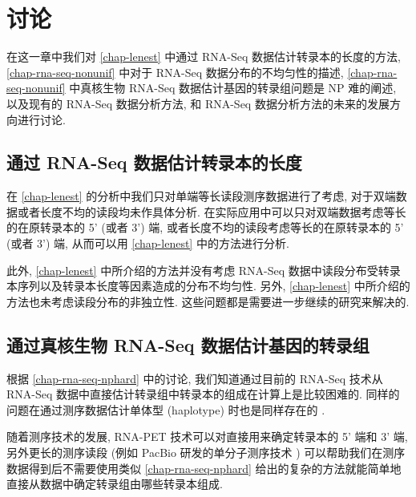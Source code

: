 \chapter{讨论}
在这一章中我们对 \ref{chap-lenest} 中通过 RNA-Seq 数据估计转录本的长度的方法, 
\ref{chap-rna-seq-nonunif} 中对于 RNA-Seq 数据分布的不均匀性的描述, 
\ref{chap-rna-seq-nonunif} 中真核生物 RNA-Seq 数据估计基因的转录组问题是 NP 难的阐述, 
以及现有的 RNA-Seq 数据分析方法, 
和 RNA-Seq 数据分析方法的未来的发展方向进行讨论. 

\section{通过 RNA-Seq 数据估计转录本的长度}
在 \ref{chap-lenest} 的分析中我们只对单端等长读段测序数据进行了考虑, 
对于双端数据或者长度不均的读段均未作具体分析. 
在实际应用中可以只对双端数据考虑等长的在原转录本的 5' (或者 3') 端, 
或者长度不均的读段考虑等长的在原转录本的 5' (或者 3') 端, 
从而可以用 \ref{chap-lenest} 中的方法进行分析. 

此外, \ref{chap-lenest} 中所介绍的方法并没有考虑 RNA-Seq 
数据中读段分布受转录本序列以及转录本长度等因素造成的分布不均匀性. 
另外, \ref{chap-lenest} 中所介绍的方法也未考虑读段分布的非独立性. 
这些问题都是需要进一步继续的研究来解决的. 

\section{通过真核生物 RNA-Seq 数据估计基因的转录组}
根据 \ref{chap-rna-seq-nphard} 中的讨论, 
我们知道通过目前的 RNA-Seq 技术从 RNA-Seq 数据中直接估计转录组中转录本的组成在计算上是比较困难的. 
同样的问题在通过测序数据估计单体型 (haplotype) 
\cite{Li_Kim_Waterman_2004, Xing_Jordan_Sharan_2007} 时也是同样存在的 \cite{1668028}. 

随着测序技术的发展, 
RNA-PET \cite{Fullwood01042009} 技术可以对直接用来确定转录本的 5' 端和 3' 端, 
另外更长的测序读段 (例如 PacBio 研发的单分子测序技术 \cite{hybrid.rna.seq.2012})
可以帮助我们在测序数据得到后不需要使用类似 \ref{chap-rna-seq-nphard} 
给出的复杂的方法就能简单地直接从数据中确定转录组由哪些转录本组成. 

